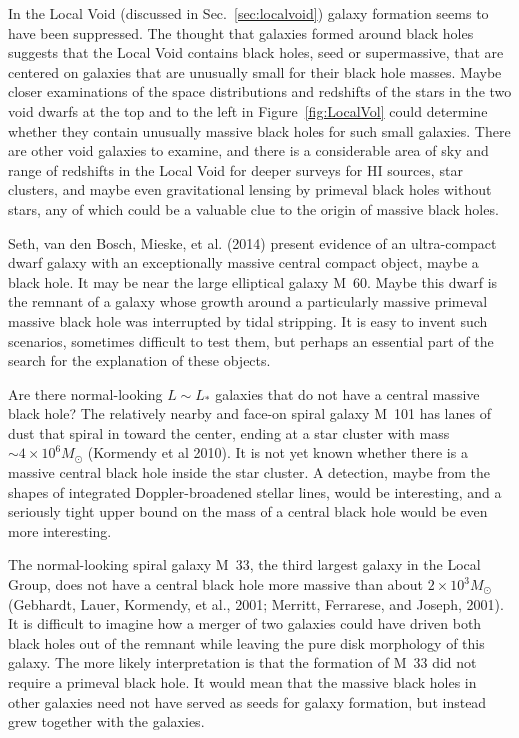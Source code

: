\documentclass[fleqn,usenatbib]{mnras}
\begin{document}
In the Local Void (discussed in Sec.~\ref{sec:localvoid}) galaxy formation seems to have been  suppressed. The thought that galaxies formed around black holes suggests that the Local Void contains black holes, seed or supermassive, that are centered on galaxies that are unusually small for their black hole masses. Maybe closer examinations of the space distributions and redshifts of the stars in the two void dwarfs at the top and to the left in Figure~\ref{fig:LocalVol}  could determine whether they contain unusually massive black holes for such small galaxies. There are other void galaxies to examine, and there is a considerable area of sky and range of redshifts in the Local Void for deeper surveys for HI sources, star clusters, and maybe even gravitational lensing by primeval black holes without stars, any of which could be a valuable clue to the origin of massive black holes.  

Seth, van den Bosch, Mieske, et al. (2014) present evidence of an ultra-compact dwarf galaxy with an exceptionally massive central compact object, maybe a black hole. It may be near the large elliptical galaxy M~60. Maybe this dwarf is the remnant of a galaxy whose growth around a particularly massive primeval massive black hole was interrupted by tidal stripping. It is easy to invent such scenarios, sometimes difficult to test them, but perhaps an essential part of the search for the explanation of these objects.

Are there normal-looking $L\sim L_\ast$ galaxies that do not have a central massive black hole? The relatively nearby and face-on spiral galaxy M~101 has lanes of dust that spiral in toward the center, ending at a star cluster with mass $\sim 4\times 10^6M_\odot$ (Kormendy et al 2010). It is not yet known whether there is a massive central black hole inside the star cluster. A detection, maybe from the shapes of integrated Doppler-broadened stellar lines, would be interesting, and a seriously tight upper bound on the mass of a central black hole would be even more interesting. 

The normal-looking spiral galaxy M~33, the third largest galaxy in the Local Group, does not have a central black hole more massive than about $2\times 10^3M_\odot$ (Gebhardt, Lauer, Kormendy, et al., 2001; Merritt, Ferrarese, and Joseph, 2001). It is difficult to imagine how a merger of two galaxies could have driven both black holes out of the remnant while leaving the pure disk morphology of this galaxy. The more likely interpretation is that the formation of M~33 did not require a primeval black hole. It would mean that the massive black holes in other galaxies need not have served as seeds for galaxy formation, but instead grew together with the galaxies. 
\end{document}
